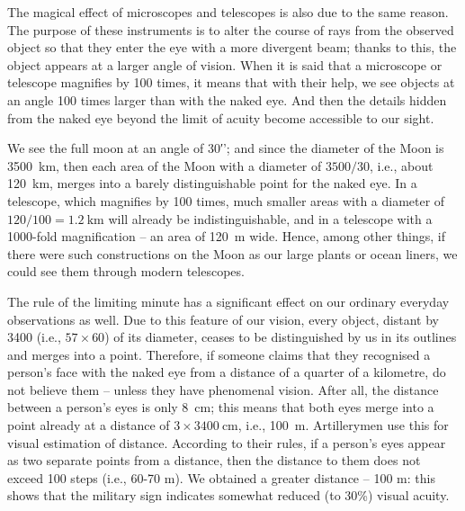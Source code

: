 The magical effect of microscopes and telescopes is also due to the same reason. The purpose of these instruments is to alter the course of rays from the observed object so that they enter the eye with a more divergent beam; thanks to this, the object appears at a larger angle of vision. When it is said that a microscope or telescope magnifies by 100 times, it means that with their help, we see objects at an angle 100 times larger than with the naked eye. And then the details hidden from the naked eye beyond the limit of acuity become accessible to our sight. 

We see the full moon at an angle of \ang{;30}'; and since the diameter of the Moon is \SI{3500}{\kilo\meter}, then each area of the Moon with a diameter of $3500/30$, i.e., about \SI{120}{\kilo\meter}, merges into a barely distinguishable point for the naked eye. In a telescope, which magnifies by 100 times, much smaller areas with a diameter of $120/100 = \SI{1.2}{\kilo\meter}$ will already be indistinguishable, and in a telescope with a 1000-fold magnification -- an area of \SI{120}{\meter} wide. Hence, among other things, if there were such constructions on the Moon as our large plants or ocean liners, we could see them through modern telescopes.

The rule of the limiting minute has a significant effect on our ordinary everyday observations as well. Due to this feature of our vision, every object, distant by 3400 (i.e., $57 \times 60$) of its diameter, ceases to be distinguished by us in its outlines and merges into a point. Therefore, if someone claims that they recognised a person's face with the naked eye from a distance of a quarter of a kilometre, do not believe them -- unless they have phenomenal vision. After all, the distance between a person's eyes is only \SI{8}{\centi\meter}; this means that both eyes merge into a point already at a distance of $3 \times \SI{3400}{\centi\meter}$, i.e., \SI{100}{\meter}. Artillerymen use this for visual estimation of distance. According to their rules, if a person's eyes appear as two separate points from a distance, then the distance to them does not exceed 100 steps (i.e., 60-70 m). We obtained a greater distance -- 100 m: this shows that the military sign indicates somewhat reduced (to 30\%) visual acuity.


